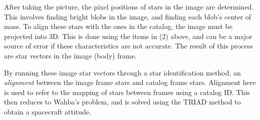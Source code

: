 After taking the picture, the pixel positions of stars in the image are determined. This involves finding bright blobs
in the image, and finding each blob's center of mass. To align these stars with the ones in the catalog, the image must
be projected into 3D. This is done using the items in (2) above, and can be a major source of error if these
characteristics are not accurate. The result of this process are star vectors in the image (body) frame.

By running these image star vectors through a star identification method, an \textit{alignment} between the image frame
stars and catalog frame stars. Alignment here is used to refer to the mapping of stars between frames using a catalog
ID. This then reduces to Wahba's problem, and is solved using the TRIAD method to obtain a spacecraft attitude.